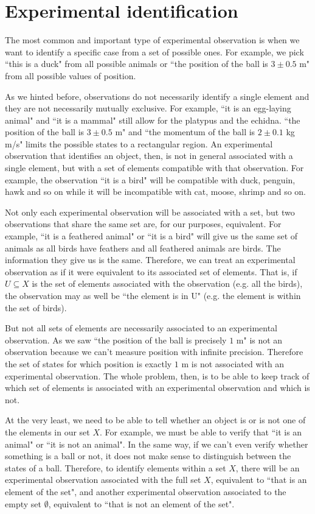 \documentclass[11pt,letterpaper,fleqn]{memoir} %
\begin{document}
\section{Experimental identification}

The most common and important type of experimental observation is when we want to identify a specific case from a set of possible ones. For example, we pick ``this is a duck" from all possible animals or ``the position of the ball is $3 \pm 0.5$ m" from all possible values of position.

As we hinted before, observations do not necessarily identify a single element and they are not necessarily mutually exclusive. For example, ``it is an egg-laying animal" and ``it is a mammal" still allow for the platypus and the echidna. ``the position of the ball is $3 \pm 0.5$ m" and ``the momentum of the ball is $2 \pm 0.1$ kg m/s" limits the possible states to a rectangular region. An experimental observation that identifies an object, then, is not in general associated with a single element, but with a set of elements compatible with that observation. For example, the observation ``it is a bird" will be compatible with duck, penguin, hawk and so on while it will be incompatible with cat, moose, shrimp and so on.

Not only each experimental observation will be associated with a set, but two observations that share the same set are, for our purposes, equivalent. For example, ``it is a feathered animal" or ``it is a bird" will give us the same set of animals as all birds have feathers and all feathered animals are birds. The information they give us is the same. Therefore, we can treat an experimental observation as if it were equivalent to its associated set of elements. That is, if $U \subseteq X$ is the set of elements associated with the observation (e.g. all the birds), the observation may as well be ``the element is in U" (e.g. the element is within the set of birds).

But not all sets of elements are necessarily associated to an experimental observation. As we saw ``the position of the ball is precisely $1$ m" is not an observation because we can't measure position with infinite precision. Therefore the set of states for which position is exactly $1$ m is not associated with an experimental observation. The whole problem, then, is to be able to keep track of which set of elements is associated with an experimental observation and which is not.

At the very least, we need to be able to tell whether an object is or is not one of the elements in our set $X$. For example, we must be able to verify that ``it is an animal" or ``it is not an animal". In the same way, if we can't even verify whether something is a ball or not, it does not make sense to distinguish between the states of a ball. Therefore, to identify elements within a set $X$, there will be an experimental observation associated with the full set $X$, equivalent to ``that is an element of the set", and another experimental observation associated to the empty set $\emptyset$, equivalent to ``that is not an element of the set".
\end{document}
